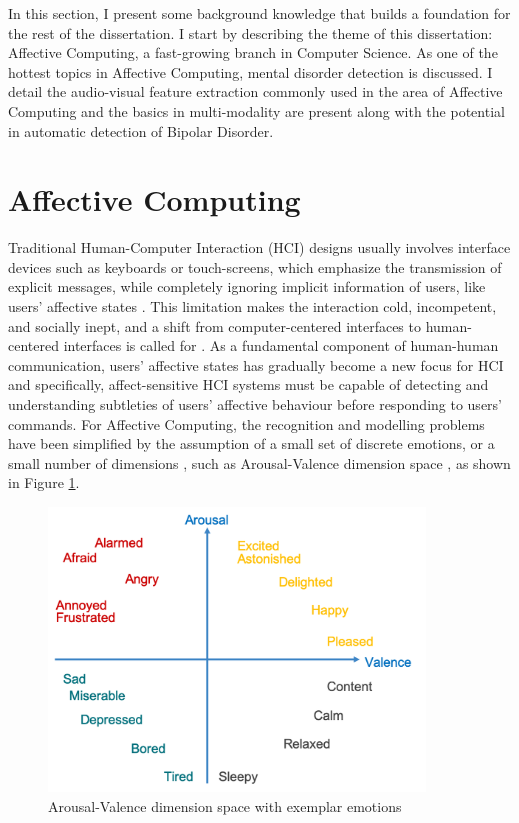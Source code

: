 

In this section, I present some background knowledge that builds a foundation for the rest of the dissertation. I start by describing the theme of this dissertation: Affective Computing, a fast-growing branch in Computer Science. As one of the hottest topics in Affective Computing, mental disorder detection is discussed. I detail the audio-visual feature extraction commonly used in the area of Affective Computing and the basics in multi-modality are present along with the potential in automatic detection of Bipolar Disorder.










\section{Affective Computing}

Traditional Human-Computer Interaction (HCI) designs usually involves interface devices such as keyboards or touch-screens, which emphasize the transmission of explicit messages, while completely ignoring implicit information of users, like users' affective states \cite{zeng2008}. This limitation makes the interaction cold, incompetent, and socially inept, and a shift from computer-centered interfaces to human-centered interfaces is called for \cite{pantic2007}. As a fundamental component of human-human communication, users' affective states has gradually become a new focus for HCI \cite{cohn2007} and specifically, affect-sensitive HCI systems must be capable of detecting and understanding subtleties of users' affective behaviour before responding to users' commands. For Affective Computing, the recognition and modelling problems have been simplified by the assumption of a small set of discrete emotions, or a small number of dimensions \cite{picard2000}, such as Arousal-Valence dimension space \cite{barrett1998}, as shown in Figure \ref{fig:arousal_valence}.

\begin{figure}
    \centering
    \includegraphics[width=10cm]{images/background/arousal_valence.png}
    \caption{Arousal-Valence dimension space with exemplar emotions}
    \label{fig:arousal_valence}
\end{figure}


